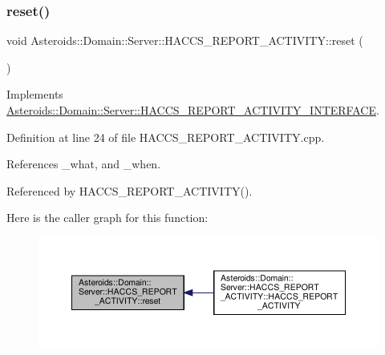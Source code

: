 \subsubsection{\texorpdfstring{reset()}{reset()}}
{\footnotesize\ttfamily void Asteroids\+::\+Domain\+::\+Server\+::\+H\+A\+C\+C\+S\+\_\+\+R\+E\+P\+O\+R\+T\+\_\+\+A\+C\+T\+I\+V\+I\+T\+Y\+::reset (\begin{DoxyParamCaption}{ }\end{DoxyParamCaption})\hspace{0.3cm}{\ttfamily [virtual]}}



Implements \hyperlink{classAsteroids_1_1Domain_1_1Server_1_1HACCS__REPORT__ACTIVITY__INTERFACE_a8c33539f165e6ac0fc83cb7500540d24}{Asteroids\+::\+Domain\+::\+Server\+::\+H\+A\+C\+C\+S\+\_\+\+R\+E\+P\+O\+R\+T\+\_\+\+A\+C\+T\+I\+V\+I\+T\+Y\+\_\+\+I\+N\+T\+E\+R\+F\+A\+CE}.



Definition at line 24 of file H\+A\+C\+C\+S\+\_\+\+R\+E\+P\+O\+R\+T\+\_\+\+A\+C\+T\+I\+V\+I\+T\+Y.\+cpp.



References \+\_\+what, and \+\_\+when.



Referenced by H\+A\+C\+C\+S\+\_\+\+R\+E\+P\+O\+R\+T\+\_\+\+A\+C\+T\+I\+V\+I\+T\+Y().

Here is the caller graph for this function\+:\nopagebreak
\begin{figure}[H]
\begin{center}
\leavevmode
\includegraphics[width=350pt]{classAsteroids_1_1Domain_1_1Server_1_1HACCS__REPORT__ACTIVITY_a2c3003f6cf17387190009a152644b80f_icgraph}
\end{center}
\end{figure}
\mbox{\label{classAsteroids_1_1Domain_1_1Server_1_1HACCS__REPORT__ACTIVITY_ac288905c22c264101f873e4aa46b05f8}} 
